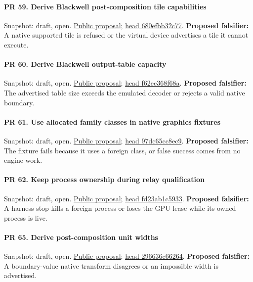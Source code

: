 \paragraph{PR 59. Derive Blackwell post-composition tile capabilities}
\readcode Snapshot: draft, open.
\href{\repobase/pull/59}{Public proposal};
\href{\repobase/commit/680efbb32c7742026812303604cd60e37ede53e1}{head 680efbb32c77}.
\textbf{Proposed falsifier:} A native supported tile is refused or the virtual device advertises a
  tile it cannot execute.

\paragraph{PR 60. Derive Blackwell output-table capacity}
\readcode Snapshot: draft, open.
\href{\repobase/pull/60}{Public proposal};
\href{\repobase/commit/f62ec368f68a204a23b3707a135178cbeb6ba9f9}{head f62ec368f68a}.
\textbf{Proposed falsifier:} The advertised table size exceeds the emulated decoder or rejects a
  valid native boundary.

\paragraph{PR 61. Use allocated family classes in native graphics fixtures}
\readcode Snapshot: draft, open.
\href{\repobase/pull/61}{Public proposal};
\href{\repobase/commit/97dc65cc8ec9a1317bb2dcf9b828c2fb8780688c}{head 97dc65cc8ec9}.
\textbf{Proposed falsifier:} The fixture fails because it uses a foreign class, or false success
  comes from no engine work.

\paragraph{PR 62. Keep process ownership during relay qualification}
\readcode Snapshot: draft, open.
\href{\repobase/pull/62}{Public proposal};
\href{\repobase/commit/fd23ab1c5933d196847eba4c91eae6b97559ed51}{head fd23ab1c5933}.
\textbf{Proposed falsifier:} A harness stop kills a foreign process or loses the GPU lease while its
  owned process is live.

\paragraph{PR 65. Derive post-composition unit widths}
\readcode Snapshot: draft, open.
\href{\repobase/pull/65}{Public proposal};
\href{\repobase/commit/296636c66264b94b591f77fb38dae71d4b13ef1a}{head 296636c66264}.
\textbf{Proposed falsifier:} A boundary-value native transform disagrees or an impossible width is
  advertised.

